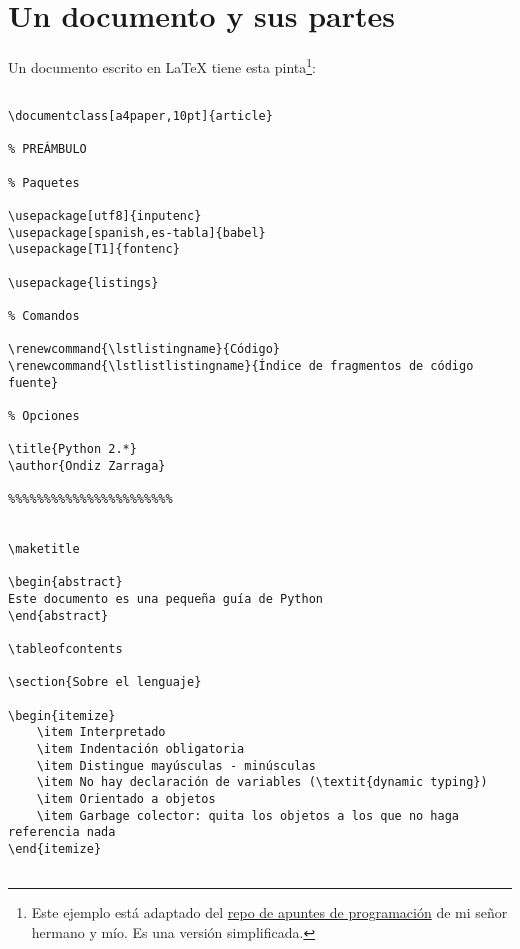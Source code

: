 \section{Un documento y sus partes}\label{un-documento-y-sus-partes}

Un documento escrito en LaTeX tiene esta pinta\footnote{Este ejemplo
  está adaptado del
  \href{https://github.com/ekaitz-zarraga/programming-notes}{repo de
  apuntes de programación} de mi señor hermano y mío. Es una versión
  simplificada.}:

\begin{lstlisting}[caption=Ejemplo de documento escrito con \LaTeX]

\documentclass[a4paper,10pt]{article}

% PREÁMBULO 

% Paquetes

\usepackage[utf8]{inputenc}
\usepackage[spanish,es-tabla]{babel}
\usepackage[T1]{fontenc}

\usepackage{listings}

% Comandos

\renewcommand{\lstlistingname}{Código}
\renewcommand{\lstlistlistingname}{Índice de fragmentos de código fuente}

% Opciones

\title{Python 2.*}
\author{Ondiz Zarraga}

%%%%%%%%%%%%%%%%%%%%%%%


\maketitle

\begin{abstract}
Este documento es una pequeña guía de Python 
\end{abstract}

\tableofcontents

\section{Sobre el lenguaje}

\begin{itemize}
    \item Interpretado
    \item Indentación obligatoria
    \item Distingue mayúsculas - minúsculas
    \item No hay declaración de variables (\textit{dynamic typing})
    \item Orientado a objetos  
    \item Garbage colector: quita los objetos a los que no haga referencia nada
\end{itemize}


\end{lstlisting}

